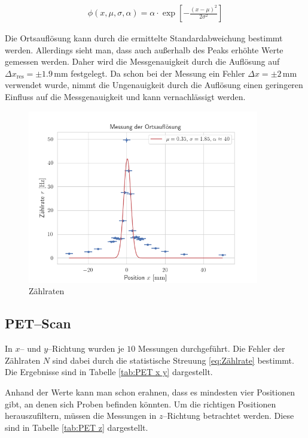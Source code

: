 \documentclass[12pt,a4paper]{scrartcl}
\numberwithin{equation}{section} %
\begin{document}
\begin{eqnarray}
    \phi(x, \mu, \sigma, \alpha) = \alpha\cdot \exp\left[- \frac{(x - \mu)^2}{2\sigma^2} \right]
\end{eqnarray}

\noindent
Die Ortsauflösung kann durch die ermittelte Standardabweichung bestimmt werden. Allerdings sieht man, dass auch außerhalb des Peaks erhöhte Werte gemessen werden. Daher wird die Messgenauigkeit durch die Auflösung auf $\Delta x_\mathrm{res}=\pm 1.9\,\mathrm{mm}$ festgelegt. Da schon bei der Messung ein Fehler $\Delta x=\pm 2\,\mathrm{mm}$ verwendet wurde, nimmt die Ungenauigkeit durch die Auflösung einen geringeren Einfluss auf die Messgenauigkeit und kann vernachlässigt werden.

\begin{figure}[h]
	\centering
	\includegraphics[width=0.9\textwidth]{../media/B3.4/Ortsaufloesung_fit.png}
	\caption{Zählraten}
	\label{abb:zaehlrate}
\end{figure}

\clearpage
\hypertarget{petscan}{%
\subsection{PET--Scan}\label{petscan}}
In $x$-- und $y$--Richtung wurden je $10$ Messungen durchgeführt. Die Fehler der Zählraten $N$ sind dabei durch die statistische Streuung \eqref{eq:Zählrate} bestimmt. Die Ergebnisse sind in Tabelle \ref{tab:PET x y} dargestellt.

Anhand der Werte kann man schon erahnen, dass es mindesten vier Positionen gibt, an denen sich Proben befinden könnten. Um die richtigen Positionen herauszufiltern, müssen die Messungen in $z$--Richtung betrachtet werden. Diese sind in Tabelle \ref{tab:PET z} dargestellt.
\end{document}
